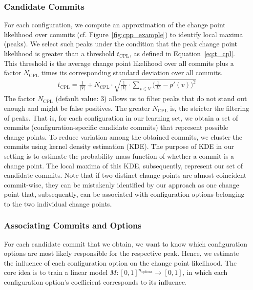 \documentclass[sigconf]{acmart}
\begin{document}
	\subsubsection{Candidate Commits}
	For each configuration, we compute an approximation of the change point likelihood over commits (cf. Figure~\ref{fig:cpp_example}) to identify local maxima (peaks). We select such peaks under the condition that the peak change point likelihood is greater than a  threshold $t_\text{CPL}$, as defined in Equation~\ref{eq:t_cpl}. This threshold is the average change point likelihood over all commits plus a factor $N_\text{CPL}$ times its corresponding standard deviation over all commits. 
	\begin{equation}
	\begin{gathered}
	t_\text{CPL} = \frac{1}{\vert V\vert} + N_\text{CPL} \cdot \sqrt{\frac{1}{\vert V\vert} \cdot \sum_{v \in V} \Big(\frac{1}{\vert V\vert} - p'(v)\Big)^2}
	\label{eq:t_cpl}
	\end{gathered}
	\end{equation}
	The factor $N_\text{CPL}$ (default value: 3) allows us to filter peaks that do not stand out enough and might be false positives. The greater $N_\text{CPL}$ is, the stricter the filtering of peaks. That is, for each configuration in our learning set, we obtain a set of commits (configuration-specific candidate commits) that represent possible change points.
	To reduce variation among the obtained commits, we cluster the commits using kernel density estimation (KDE). The purpose of KDE in our setting is to estimate the probability mass function of whether a commit is a change point. The local maxima of this KDE, subsequently, represent our set of candidate commits. Note that if two distinct change points are almost coincident commit-wise, they can be mistakenly identified by our approach as one change point that, subsequently, can be associated with configuration options belonging to the two individual change points.
	
	\subsubsection{Associating Commits and Options}
	For each candidate commit that we obtain, we want to know which configuration options are most likely responsible for the respective peak. Hence, we estimate the influence  of each configuration option on the change point likelihood. The core idea is to train a linear model $M: [0,1]^{n_{\text{options}}} \rightarrow [0,1]$, in which each configuration option's coefficient corresponds to its influence. 
	
\end{document}
